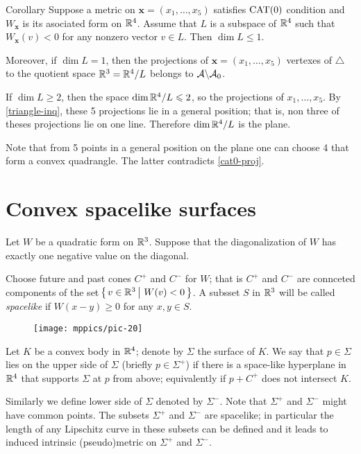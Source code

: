 \documentclass{article}
\begin{document}
\begin{thm}{Corollary}\label{cor:3+2}
Suppose a metric on $\bm{x}=(x_1,\dots,x_5)$ satisfies $\mathrm{CAT}(0)$ condition
and $W_{\bm{x}}$ is its asociated form on $\mathbb{R}^{4}$.
Assume that $L$ is a subspace of $\mathbb{R}^{4}$ such that
$W_{\bm{x}}(v)< 0$ for any nonzero vector $v\in L$.
Then $\dim L\le 1$.

Moreover, if $\dim L= 1$, then the projections of $\bm{x}=(x_1,\dots,x_5)$ vertexes of $\triangle$ to the quotient space $\mathbb{R}^3=\mathbb{R}^4/L$ belongs to $\mathcal{A}\backslash\mathcal{A}_0$. 
\end{thm}

If $\dim L\ge 2$, then the space $\mathop{\rm dim}\nolimits \mathbb{R}^4/L\leqslant 2$, so the projections of $x_1,\dots,x_5$.
By \ref{triangle-inq}, these 5 projections lie in a general position; that is, non three of theses projections lie on one line. 
Therefore $\mathop{\rm dim}\nolimits \mathbb{R}^4/L$ is the plane.

Note that from 5 points in a general position on the plane one can choose 4 that form a convex quadrangle.
The latter contradicts \ref{cat0-proj}.
\qeds

\section{Convex spacelike surfaces}

Let $W$ be a quadratic form on $\mathbb{R}^3$.
Suppose that the diagonalization of $W$ has exactly one negative value on the diagonal.

Choose future and past cones $C^+$ and $C^-$ for $W$;
that is $C^+$ and $C^-$ are connceted components of the set
$\set{v\in\RR^3}{W(v)< 0}$.
A subsset $S$ in $\mathbb{R}^3$ will be called \emph{spacelike} if $W(x-y)\ge 0$ for any $x,y\in S$.

\begin{wrapfigure}{r}{53mm}
\vskip-4mm
\centering
\texttt{[image: mppics/pic-20]}
\end{wrapfigure}

Let $K$ be a convex body in $\mathbb{R}^4$;
denote by $\Sigma$ the surface of $K$. 
We say that $p\in \Sigma$ lies on the upper side of $\Sigma$ (briefly $p\in\Sigma^+$) if there is a space-like hyperplane in $\mathbb{R}^4$ that supports $\Sigma$ at $p$ from above;
equivalently if $p+C^+$ does not intersect $K$.

Similarly we define lower side of $\Sigma$ denoted by $\Sigma^-$.
Note that $\Sigma^+$ and $\Sigma^-$ might have common points.
The subsets $\Sigma^+$ and $\Sigma^-$ are spacelike;
in particular the length of any Lipschitz curve in these subsets can be defined and it leads to induced intrinsic (pseudo)metric on $\Sigma^+$ and $\Sigma^-$. 
\end{document}
